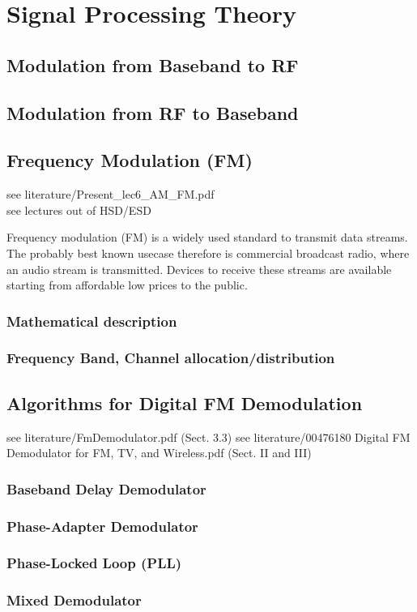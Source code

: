 \chapter{Signal Processing Theory}
\label{cha:TheThesis}

  \section{Modulation from Baseband to RF}
  \section{Modulation from RF to Baseband}

  \section{Frequency Modulation (FM)}
  see literature/Present\_lec6\_AM\_FM.pdf\\
  see lectures out of HSD/ESD

  Frequency modulation (FM) is a widely used standard to transmit data streams.
  The probably best known usecase therefore is commercial broadcast radio, where an audio stream is transmitted.
  Devices to receive these streams are available starting from affordable low prices to the public.


    \subsection{Mathematical description}
    \subsection{Frequency Band, Channel allocation/distribution}

  \section{Algorithms for Digital FM Demodulation}
    see literature/FmDemodulator.pdf (Sect. 3.3)
    see literature/00476180 Digital FM Demodulator for FM, TV, and Wireless.pdf (Sect. II and III)

    \subsection{Baseband Delay Demodulator}
    \subsection{Phase-Adapter Demodulator}
    \subsection{Phase-Locked Loop (PLL)}
    \subsection{Mixed Demodulator}

